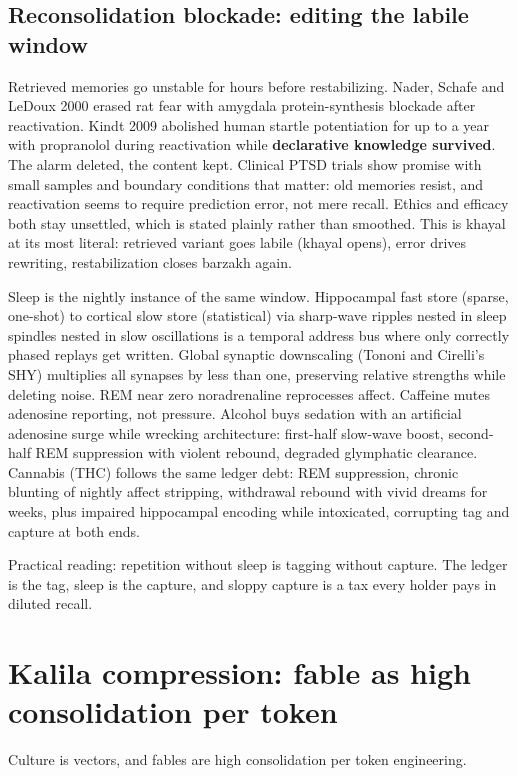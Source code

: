 \subsection{Reconsolidation blockade: editing the labile window}

Retrieved memories go unstable for hours before restabilizing. Nader, Schafe and LeDoux 2000 erased rat fear with amygdala protein-synthesis blockade after reactivation. Kindt 2009 abolished human startle potentiation for up to a year with propranolol during reactivation while \textbf{declarative knowledge survived}. The alarm deleted, the content kept. Clinical PTSD trials show promise with small samples and boundary conditions that matter: old memories resist, and reactivation seems to require prediction error, not mere recall. Ethics and efficacy both stay unsettled, which is stated plainly rather than smoothed. This is khayal at its most literal: retrieved variant goes labile (khayal opens), error drives rewriting, restabilization closes barzakh again.

Sleep is the nightly instance of the same window. Hippocampal fast store (sparse, one-shot) to cortical slow store (statistical) via sharp-wave ripples nested in sleep spindles nested in slow oscillations is a temporal address bus where only correctly phased replays get written. Global synaptic downscaling (Tononi and Cirelli's SHY) multiplies all synapses by less than one, preserving relative strengths while deleting noise. REM near zero noradrenaline reprocesses affect. Caffeine mutes adenosine reporting, not pressure. Alcohol buys sedation with an artificial adenosine surge while wrecking architecture: first-half slow-wave boost, second-half REM suppression with violent rebound, degraded glymphatic clearance. Cannabis (THC) follows the same ledger debt: REM suppression, chronic blunting of nightly affect stripping, withdrawal rebound with vivid dreams for weeks, plus impaired hippocampal encoding while intoxicated, corrupting tag and capture at both ends.

Practical reading: repetition without sleep is tagging without capture. The ledger is the tag, sleep is the capture, and sloppy capture is a tax every holder pays in diluted recall.

\section{Kalila compression: fable as high consolidation per token}

Culture is vectors, and fables are high consolidation per token engineering.

